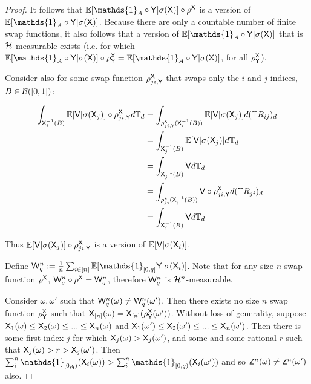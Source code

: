 \begin{proof}
It follows that $\mathbb{E}[\mathds{1}_A\circ\RV{Y}|\sigma(\RV{X})] \circ\rho^{\RV{X}}$ is a version of $\mathbb{E}[\mathds{1}_A\circ\RV{Y}|\sigma(\RV{X})]$. Because there are only a countable number of finite swap functions, it also follows that a version of $\mathbb{E}[\mathds{1}_A\circ\RV{Y}|\sigma(\RV{X})]$ that is $\mathcal{H}$-measurable exists (i.e. for which $\mathbb{E}[\mathds{1}_A\circ\RV{Y}|\sigma(\RV{X})]\circ\rho^{\RV{X}}_{\RV{Y}} = \mathbb{E}[\mathds{1}_A\circ\RV{Y}|\sigma(\RV{X})]$, for all $\rho^{\mathsf{X}}_{\mathsf{Y}}$).

Consider also for some swap function $\rho^{\mathsf{X}}_{ji,\mathsf{Y}}$ that swaps only the $i$ and $j$ indices, $B\in \mathcal{B}([0,1])$:

\begin{align}
    \int_{\mathsf{X}_i^{-1}(B)} \mathbb{E}[\mathsf{V}|\sigma(\mathsf{X}_j)] \circ \rho^{\mathsf{X}}_{ji,\mathsf{Y}} d\mathbb{T}_d &= \int_{\rho^{\mathsf{X}}_{ji,\mathsf{Y}}(\mathsf{X}_i^{-1}(B))} \mathbb{E}[\mathsf{V}|\sigma(\mathsf{X}_j)] d(\mathbb{T}R_{ij})_d\\
                                                                               &= \int_{\mathsf{X}^{-1}_{j}(B)} \mathbb{E}[\mathsf{V}|\sigma(\mathsf{X}_j)] d\mathbb{T}_d\\
                                                                               &= \int_{\mathsf{X}_j^{-1}(B)} \mathsf{V} d\mathbb{T}_d\\
                                                                               &= \int_{\rho_{ji}^*(\mathsf{X}_j^{-1}(B))}\mathsf{V}\circ \rho^{\mathsf{X}}_{ji,\mathsf{Y}} d(\mathbb{T}R_{ji})_d\\
                                                                               &= \int_{\mathsf{X}_i^{-1}(B)} \mathsf{V}d\mathbb{T}_d
\end{align}

Thus $\mathbb{E}[\mathsf{V}|\sigma(\mathsf{X}_j)]\circ\rho^{\mathsf{X}}_{ji,\mathsf{Y}}$ is a version of $\mathbb{E}[\mathsf{V}|\sigma({\mathsf{X}_i})]$.

Define $\RV{W}^n_q := \frac{1}{n}\sum_{i\in [n]} \mathbb{E}[\mathds{1}_{[0,q]}\RV{Y}|\sigma(\RV{X}_i)]$. Note that for any size $n$ swap function $\rho^{\mathsf{X}}$, $\mathsf{W}^n_q\circ\rho^{\mathsf{X}}=\mathsf{W}_q^n$, therefore $\mathsf{W}_q^n$ is $\mathcal{H}^n$-measurable. 

Consider $\omega,\omega'$ such that $\mathsf{W}_q^n(\omega)\neq \mathsf{W}_q^n(\omega')$. Then there exists no size $n$ swap function $\rho^{\mathsf{X}}_{\mathsf{Y}}$ such that $\mathsf{X}_{[n]}(\omega)=\mathsf{X}_{[n]}(\rho^{\mathsf{X}}_{\mathsf{Y}}(\omega'))$. Without loss of generality, suppose $\mathsf{X}_1(\omega)\leq\mathsf{X}_2(\omega)\leq...\leq\mathsf{X}_n(\omega)$ and $\mathsf{X}_1(\omega')\leq\mathsf{X}_2(\omega')\leq...\leq\mathsf{X}_n(\omega')$. Then there is some first index $j$ for which $\mathsf{X}_{j}(\omega)> \mathsf{X}_{j}(\omega')$, and some and some rational $r$ such that $\mathsf{X}_j(\omega)>r>\mathsf{X}_j(\omega')$. Then $\sum_{i}^n \mathds{1}_{[0,q)}(\RV{X}_i(\omega)) > \sum_i^n \mathds{1}_{[0,q)}(\RV{X}_i(\omega'))$ and so $\mathsf{Z}^n(\omega)\neq\mathsf{Z}^n(\omega')$ also.


\end{proof}
